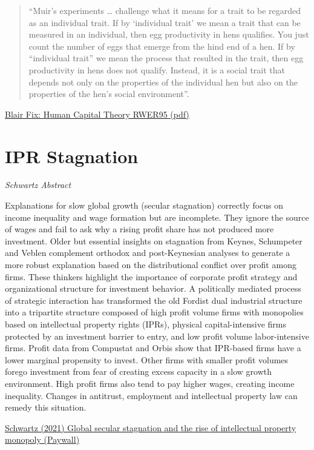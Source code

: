 \documentclass[
]{book}
\begin{document}
\begin{quote}
``Muir's experiments \ldots{} challenge what it means for a trait to be regarded as
an individual trait. If by `individual trait' we mean a trait that can be measured
in an individual, then egg productivity in hens qualifies. You just count the
number of eggs that emerge from the hind end of a hen. If by ``individual trait''
we mean the process that resulted in the trait, then egg productivity in hens
does not qualify. Instead, it is a social trait that depends not only on the
properties of the individual hen but also on the properties of the hen's social
environment''.
\end{quote}

\href{pdf/Fix_2021_Human_Capital_RWER95.pdf}{Blair Fix: Human Capital Theory RWER95 (pdf)}

\hypertarget{ipr-stagnation}{%
\section{IPR Stagnation}\label{ipr-stagnation}}

\emph{Schwartz Abstract}

Explanations for slow global growth (secular stagnation) correctly focus on income inequality and wage formation but are incomplete. They ignore the source of wages and fail to ask why a rising profit share has not produced more investment. Older but essential insights on stagnation from Keynes, Schumpeter and Veblen complement orthodox and post-Keynesian analyses to generate a more robust explanation based on the distributional conflict over profit among firms. These thinkers highlight the importance of corporate profit strategy and organizational structure for investment behavior. A politically mediated process of strategic interaction has transformed the old Fordist dual industrial structure into a tripartite structure composed of high profit volume firms with monopolies based on intellectual property rights (IPRs), physical capital-intensive firms protected by an investment barrier to entry, and low profit volume labor-intensive firms. Profit data from Compustat and Orbis show that IPR-based firms have a lower marginal propensity to invest. Other firms with smaller profit volumes forego investment from fear of creating excess capacity in a slow growth environment. High profit firms also tend to pay higher wages, creating income inequality. Changes in antitrust, employment and intellectual property law can remedy this situation.

\href{https://www.tandfonline.com/doi/abs/10.1080/09692290.2021.1918745}{Schwartz (2021) Global secular stagnation and the rise of intellectual property monopoly (Paywall)}
\end{document}
